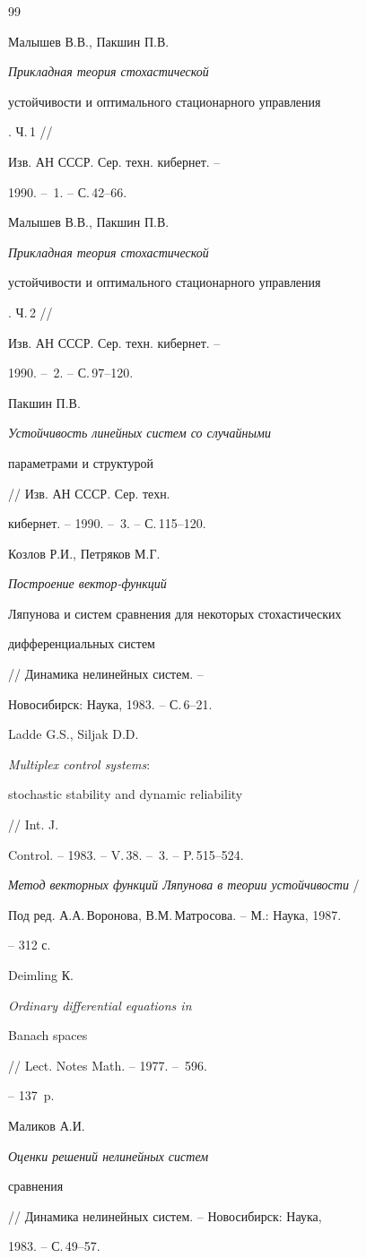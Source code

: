 \begin{thebibliography}{99}


Малышев В.В., Пакшин П.В. {\em Прикладная теория стохастической 


устойчивости и оптимального стационарного управления}. Ч.\,1 // 


Изв. АН СССР. Сер. техн. кибернет. -- 


1990. -- \No\,1. -- С.\,42--66. 




Малышев В.В., Пакшин П.В. {\em Прикладная теория стохастической 


устойчивости и оптимального стационарного управления}. Ч.\,2 // 


Изв. АН СССР. Сер. техн. кибернет. -- 


1990. -- \No\,2. -- С.\,97--120. 




Пакшин П.В. {\em Устойчивость линейных систем со случайными 


параметрами и структурой} // Изв. АН СССР. Сер. техн. 


кибернет. -- 1990. -- \No\,3. -- С.\,115--120. 




Козлов Р.И., Петряков М.Г. {\em Построение вектор-функций  


Ляпунова и систем сравнения для некоторых стохастических  


дифференциальных систем} // Динамика нелинейных систем. -- 


Новосибирск: Наука, 1983. -- С.\,6--21. 




Ladde G.S., Siljak D.D. {\em Multiplex control systems$:$ 


stochastic stability and dynamic reliability} // Int. J.  


Control. -- 1983. -- V.\,38. -- \No\,3. -- P.\,515--524. 




{\em Метод векторных функций Ляпунова в теории устойчивости} / 


Под ред. А.А.\,Воронова, В.М.\,Матросова. -- М.: Наука, 1987.  


-- 312 с. 




Deimling К. {\em Ordinary differential equations in 


Banach spaces} // Lect. Notes Math. -- 1977. -- \No\,596.


-- 137~p. 




Маликов А.И. {\em Оценки решений нелинейных систем  


сравнения} // Динамика нелинейных систем. -- Новосибирск: Наука,  


1983. -- С.\,49--57. 


 


\end{thebibliography} 



